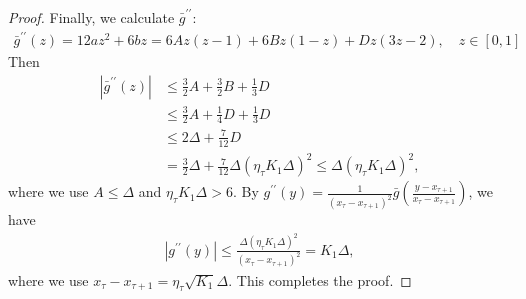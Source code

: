 \documentclass{article}
\newcommand{\paren}[1]{\left( #1 \right)}
\begin{document}
\begin{proof}
Finally, we calculate $\bar{g}^{\prime\prime}$:
\begin{align*}
    \bar{g}^{\prime\prime}(z)=12az^2+6bz=6Az\paren{z-1}+6Bz\paren{1-z}+Dz\paren{3z-2},\quad z\in[0,1]
\end{align*}
Then
\begin{equation}\nonumber
    \begin{aligned}
        |\bar{g}^{\prime\prime}(z)|&\leq \frac{3}{2}A+\frac{3}{2}B+\frac{1}{3}D\\
        &\leq \frac{3}{2}A+\frac{1}{4}D+\frac{1}{3}D\\
        &\leq 2\Delta+\frac{7}{12}D\\
        &=\frac{3}{2}\Delta+\frac{7}{12}\Delta\paren{\eta_\tau K_1\Delta}^2\leq \Delta\paren{\eta_\tau K_1\Delta}^2,
    \end{aligned}
\end{equation}
where we use $A\leq\Delta$ and $\eta_\tau K_1\Delta>6$. By $g^{\prime\prime}(y)=\frac{1}{\paren{x_\tau-x_{\tau+1}}^2}\bar{g}\paren{\frac{y-x_{\tau+1}}{x_\tau-x_{\tau+1}}}$, we have
\begin{align*}
    \left|g^{\prime\prime}(y)\right|\leq \frac{\Delta\paren{\eta_\tau K_1\Delta}^2}{\paren{x_{\tau}-x_{\tau+1}}^2}=K_1\Delta,
\end{align*}
where we use $x_{\tau}-x_{\tau+1}=\eta_\tau\sqrt{K_1}\Delta$. This completes the proof.
\end{proof}
\end{document}
